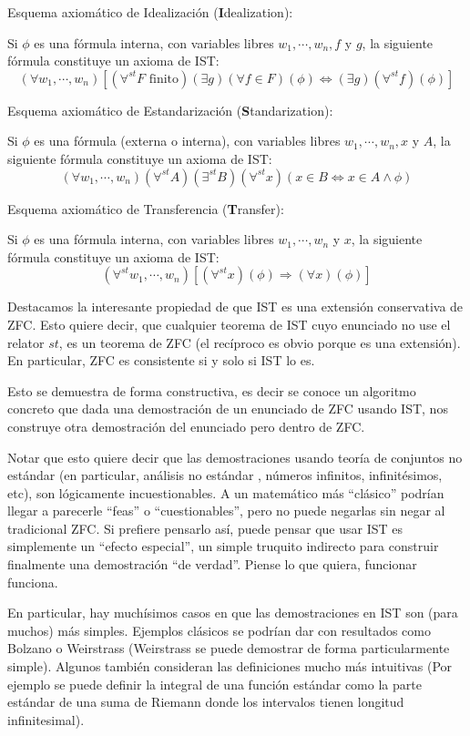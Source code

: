 \documentclass[12pt]{article}
\begin{document}
Esquema axiom\'atico de Idealizaci\'on (\textbf{I}dealization):

Si $\phi$ es una f\'ormula interna, con variables libres $w_1, \cdots , w_n,f$ y $g$, la siguiente f\'ormula
constituye un axioma de IST:
$$(\forall w_1, \cdots , w_n)\left [ (\forall^{st} F \mbox{ finito})(\exists g)(\forall f \in F)(\phi) \Leftrightarrow 
(\exists g)(\forall^{st} f)(\phi) \right ]$$

Esquema axiom\'atico de Estandarizaci\'on (\textbf{S}tandarization):

Si $\phi$ es una f\'ormula (externa o interna), con variables libres $w_1, \cdots , w_n,x$ y $A$, la siguiente f\'ormula
constituye un axioma de IST:
$$(\forall w_1, \cdots , w_n)(\forall^{st} A)(\exists^{st} B)(\forall^{st} x)(x \in B \Leftrightarrow x \in A \wedge \phi)$$

Esquema axiom\'atico de Transferencia (\textbf{T}ransfer):

Si $\phi$ es una f\'ormula interna, con variables libres $w_1, \cdots , w_n$ y $x$, la siguiente f\'ormula
constituye un axioma de IST:
$$(\forall^{st} w_1, \cdots , w_n) \left [ (\forall^{st} x)(\phi) \Rightarrow (\forall x)(\phi) \right ]$$

Destacamos la interesante propiedad de que IST es una extensión conservativa de ZFC. Esto quiere decir,
que cualquier teorema de IST cuyo enunciado no use el relator $st$, es un teorema de ZFC (el recíproco es obvio
porque es una extensión). En particular, ZFC es consistente si y solo si IST lo es.

Esto se demuestra de forma constructiva, es decir se conoce un algoritmo concreto que dada una demostración de un enunciado
de ZFC usando IST, nos construye otra demostración del enunciado pero dentro de ZFC.

Notar que esto quiere decir que las demostraciones usando teoría de conjuntos no estándar (en particular, análisis no estándar
, números infinitos, infinitésimos, etc), son lógicamente incuestionables. 
A un matemático más ``clásico'' podrían llegar a parecerle ``feas'' o ``cuestionables'', pero no puede negarlas sin negar
al tradicional ZFC. Si prefiere pensarlo así, puede pensar que usar IST es simplemente un ``efecto especial'', un simple truquito
indirecto para construir finalmente una demostración ``de verdad''. Piense lo que quiera, funcionar funciona.

En particular, hay muchísimos casos en que las demostraciones en IST son (para muchos) más simples. Ejemplos clásicos se podrían dar
con resultados como Bolzano o Weirstrass (Weirstrass se puede demostrar de forma particularmente simple). Algunos también consideran
las definiciones mucho más intuitivas (Por ejemplo se puede definir la integral de una función estándar como la parte estándar de una
suma de Riemann donde los intervalos tienen longitud infinitesimal).
\end{document}
